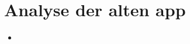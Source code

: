 \documentclass{article}
\begin{document}
\section{Analyse der alten app}
\begin{itemize}
    \item 
\end{itemize}
\end{document}

